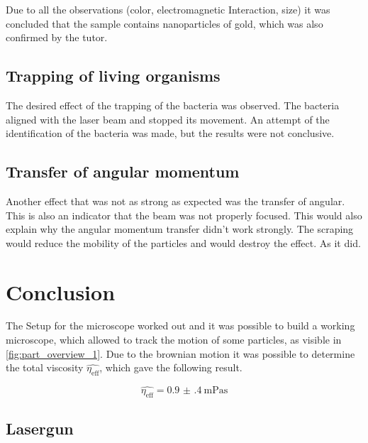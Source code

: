 \documentclass[12pt,english]{scrartcl}
\begin{document}
Due to all the observations (color, electromagnetic Interaction, size) it was
concluded that the sample contains nanoparticles of gold, which was also
confirmed by the tutor.

\subsection{Trapping of living organisms}

The desired effect of the trapping of the bacteria was observed. The bacteria
aligned with the laser beam and stopped its movement. An attempt of the
identification of the bacteria was made, but the results were not conclusive.

\subsection{Transfer of angular momentum}

Another effect that was not as strong as expected was the transfer of angular.
This is also an indicator that the beam was not properly focused. This would
also explain why the angular momentum transfer didn't work strongly. The
scraping would reduce the mobility of the particles and would destroy the
effect. As it did.

\section{Conclusion}\label{sec:zusammenfassung}


The Setup for the microscope worked out and it was possible to build a working microscope, which allowed to track the motion of 
some particles, as visible in \autoref{fig:part_overview_1}. Due to the brownian motion it was possible to determine the total
viscosity $\hat{\eta_\text{eff}}$, which gave the following result.

\begin{equation*}
	\hat{\eta_\text{eff}} = \SI{0.9(4)}{\milli\pascal\second}
\end{equation*}


\subsection{Lasergun}
\end{document}
